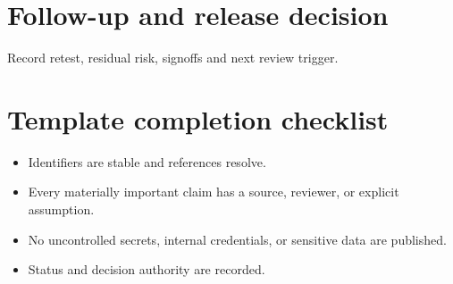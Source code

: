 \documentclass[10pt,letterpaper]{article}
\begin{document}
\section{Follow-up and release decision}
Record retest, residual risk, signoffs and next review trigger.

\section{Template completion checklist}
\begin{itemize}
\item Identifiers are stable and references resolve.
\item Every materially important claim has a source, reviewer, or explicit assumption.
\item No uncontrolled secrets, internal credentials, or sensitive data are published.
\item Status and decision authority are recorded.
\end{itemize}
\end{document}
